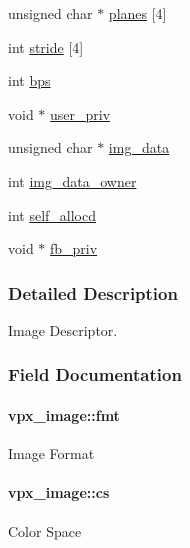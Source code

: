 \begin{DoxyCompactItemize}
\item 
unsigned char $\ast$ \hyperlink{structvpx__image_ab6258308ba7a5f4a113348120e20e2ce}{planes} \mbox{[}4\mbox{]}
\item 
int \hyperlink{structvpx__image_ac9c7b83e3eea44cb680956f90dc789cf}{stride} \mbox{[}4\mbox{]}
\item 
int \hyperlink{structvpx__image_a53a02fad822151eb8eeb2f64f195e1f6}{bps}
\item 
void $\ast$ \hyperlink{structvpx__image_a28ae6c046dfca87de4fca4e67cab563d}{user\+\_\+priv}
\item 
unsigned char $\ast$ \hyperlink{structvpx__image_a3c9b7a7a68e4a9665b47433a1e96d78b}{img\+\_\+data}
\item 
int \hyperlink{structvpx__image_a4d2c8d41b67f7d3f3114212a8d8afdce}{img\+\_\+data\+\_\+owner}
\item 
int \hyperlink{structvpx__image_a33e8c75d8efc5d4f389e8fc09283a4cc}{self\+\_\+allocd}
\item 
void $\ast$ \hyperlink{structvpx__image_a4b138b7d146dc75ef5d8947d421b0533}{fb\+\_\+priv}
\end{DoxyCompactItemize}


\subsubsection{Detailed Description}
Image Descriptor. 

\subsubsection{Field Documentation}
\paragraph[{\texorpdfstring{fmt}{fmt}}]{ vpx\+\_\+image\+::fmt}\hypertarget{structvpx__image_a1d734f8afa9200a21c2d9f6bcf8c04d8}{}\label{structvpx__image_a1d734f8afa9200a21c2d9f6bcf8c04d8}
Image Format 
\paragraph[{\texorpdfstring{cs}{cs}}]{ vpx\+\_\+image\+::cs}\hypertarget{structvpx__image_a8fda4fb8430e4cede2a4ee7d28dd0a6c}{}\label{structvpx__image_a8fda4fb8430e4cede2a4ee7d28dd0a6c}
Color Space 
